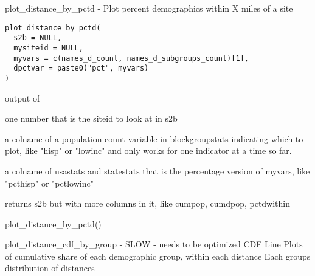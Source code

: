 \documentclass[a4paper]{book}
\begin{document}
%
\begin{Description}\relax
plot\_distance\_by\_pctd  -  Plot percent demographics within X miles of a site
\end{Description}
%
\begin{Usage}
\begin{verbatim}
plot_distance_by_pctd(
  s2b = NULL,
  mysiteid = NULL,
  myvars = c(names_d_count, names_d_subgroups_count)[1],
  dpctvar = paste0("pct", myvars)
)
\end{verbatim}
\end{Usage}
%
\begin{Arguments}
\begin{ldescription}
\item[\code{s2b}] output of 

\item[\code{mysiteid}] one number that is the siteid to look at in s2b

\item[\code{myvars}] a colname of a population count variable in blockgroupstats indicating which to plot, like "hisp" or "lowinc"
and only works for one indicator at a time so far.

\item[\code{dpctvar}] a colname of usastats and statestats that is the percentage version of myvars, like "pcthisp" or "pctlowinc"
\end{ldescription}
\end{Arguments}
%
\begin{Value}
returns s2b but with more columns in it, like cumpop, cumdpop, pctdwithin
\end{Value}
%
\begin{Examples}
\begin{ExampleCode}
  plot_distance_by_pctd()
\end{ExampleCode}
\end{Examples}
%
\begin{Description}\relax
plot\_distance\_cdf\_by\_group  - SLOW - needs to be optimized
CDF Line Plots of cumulative share of each demographic group, within each distance
Each groups distribution of distances
\end{Description}
\end{document}

